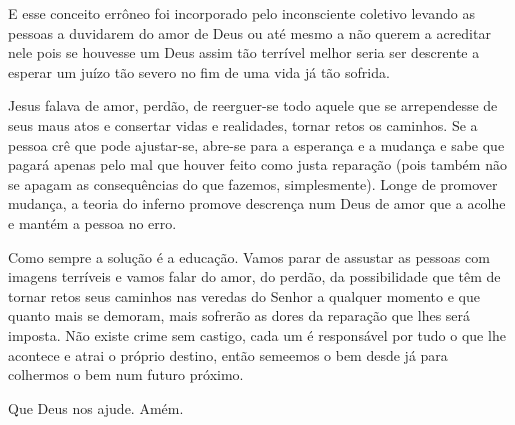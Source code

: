 \emdash{}E esse conceito errôneo foi incorporado pelo inconsciente coletivo levando as pessoas a duvidarem do amor de Deus ou até mesmo a não querem a acreditar nele pois se houvesse um Deus assim tão terrível melhor seria ser descrente a esperar um juízo tão severo no fim de uma vida já tão sofrida.

\emdash{}Jesus falava de amor, perdão, de reerguer-se todo aquele que se arrependesse de seus maus atos e consertar vidas e realidades, tornar retos os caminhos. Se a pessoa crê que pode ajustar-se, abre-se para a esperança e a mudança e sabe que pagará apenas pelo mal que houver feito como justa reparação (pois também não se apagam as consequências do que fazemos, simplesmente). Longe de promover mudança, a teoria do inferno promove descrença num Deus de amor que a acolhe e mantém a pessoa no erro.

\emdash{}Como sempre a solução é a educação. Vamos parar de assustar as pessoas com imagens terríveis e vamos falar do amor, do perdão, da possibilidade que têm de tornar retos seus caminhos nas veredas do Senhor a qualquer momento e que quanto mais se demoram, mais sofrerão as dores da reparação que lhes será imposta. Não existe crime sem castigo, cada um é responsável por tudo o que lhe acontece e atrai o próprio destino, então semeemos o bem desde já para colhermos o bem num futuro próximo.


\emdash{}Que Deus nos ajude. Amém.